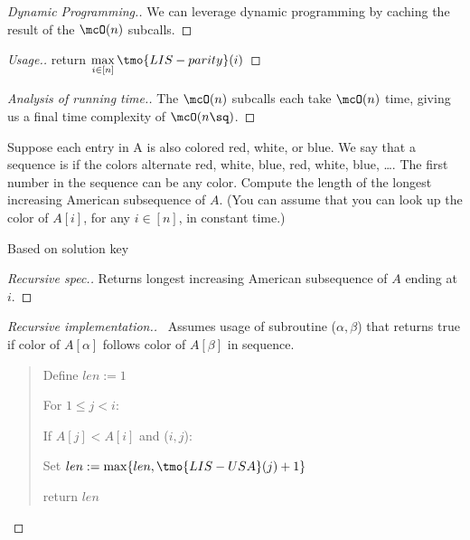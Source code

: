 \documentclass{article}
\begin{document}
\begin{proof}[Dynamic Programming.]
  We can leverage dynamic programming by caching the result of the \( \mcO(n) \) subcalls.
\end{proof}

\begin{proof}[Usage.]
  return \( \max\limits_{i\in[n]} \tmo{LIS-parity}(i) \)
\end{proof}

\begin{proof}[Analysis of running time.]
  The \( \mcO(n) \) subcalls each take \( \mcO(n) \) time, giving us a final time complexity of \( \mcO(n\sq) \).
\end{proof}
\pagebreak

\begin{subexercise}
  Suppose each entry in A is also colored red, white, or blue. We say that a sequence is  if the colors alternate red, white, blue, red, white, blue, \ldots.  The first number in the sequence can be any color. Compute the length of the longest increasing American subsequence of \( A \). (You can assume that you can look up the color of \( A[i] \), for any \( i \in [n] \), in constant time.)
\end{subexercise}

\begin{note}
  Based on solution key
\end{note}

\begin{proof}[Recursive spec.]
  Returns longest increasing American subsequence of \( A \) ending at \( i \).
\end{proof}

\begin{proof}[Recursive implementation.]\
Assumes usage of subroutine (\( \alpha,\beta \)) that returns true if color of \( A[\alpha] \) follows color of \( A[\beta] \) in sequence.
\begin{quote}
\begin{steps}
  \item Define \( len := 1 \)
  \item For \( 1\leq j < i \): \begin{steps}
    \item If \( A[j] < A[i] \) and (\( i,j \)): \begin{steps}
      \item Set \( len := \max\{len, \tmo{LIS-USA}(j)+1\} \)
    \end{steps}
  \end{steps}
  \item return \( len \)
\end{steps}
\end{quote}
\end{proof}
\end{document}
